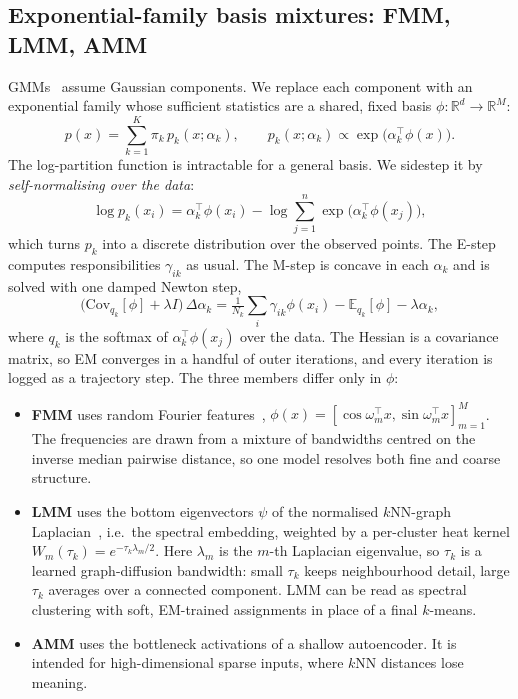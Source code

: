 \documentclass[11pt,a4paper]{article}
\newcommand{\R}{\mathbb{R}}
\begin{document}
\subsection{Exponential-family basis mixtures: FMM, LMM, AMM}\label{sec:basis}
GMMs~\cite{dempster1977maximum} assume Gaussian components. We replace each
component with an exponential family whose sufficient statistics are a shared,
fixed basis $\phi:\R^d\to\R^M$:
\[
  p(x) = \sum_{k=1}^{K}\pi_k\,p_k(x;\alpha_k),\qquad
  p_k(x;\alpha_k) \propto \exp\!\big(\alpha_k^\top\phi(x)\big).
\]
The log-partition function is intractable for a general basis. We sidestep it
by \emph{self-normalising over the data}:
\[
  \log p_k(x_i) = \alpha_k^\top\phi(x_i) - \log\sum_{j=1}^{n}\exp\!\big(\alpha_k^\top\phi(x_j)\big),
\]
which turns $p_k$ into a discrete distribution over the observed points. The
E-step computes responsibilities $\gamma_{ik}$ as usual. The M-step is
concave in each $\alpha_k$ and is solved with one damped Newton step,
\[
  \big(\mathrm{Cov}_{q_k}[\phi] + \lambda I\big)\,\Delta\alpha_k
  = \tfrac{1}{N_k}\textstyle\sum_i\gamma_{ik}\phi(x_i) - \mathbb{E}_{q_k}[\phi] - \lambda\alpha_k,
\]
where $q_k$ is the softmax of $\alpha_k^\top\phi(x_j)$ over the data. The
Hessian is a covariance matrix, so EM converges in a handful of outer
iterations, and every iteration is logged as a trajectory step. The three
members differ only in $\phi$:
\begin{itemize}
  \item \textbf{FMM} uses random Fourier features~\cite{rahimi2007random},
  $\phi(x) = [\cos\omega_m^\top x, \sin\omega_m^\top x]_{m=1}^{M}$. The
  frequencies are drawn from a mixture of bandwidths centred on the inverse
  median pairwise distance, so one model resolves both fine and coarse
  structure.
  \item \textbf{LMM} uses the bottom eigenvectors $\psi$ of the normalised
  $k$NN-graph Laplacian~\cite{vonluxburg2007tutorial}, i.e.\ the spectral
  embedding, weighted by a per-cluster heat kernel
  $W_m(\tau_k) = e^{-\tau_k\lambda_m/2}$. Here $\lambda_m$ is the $m$-th
  Laplacian eigenvalue, so $\tau_k$ is a learned graph-diffusion bandwidth:
  small $\tau_k$ keeps neighbourhood detail, large $\tau_k$ averages over a
  connected component. LMM can be read as spectral clustering with soft,
  EM-trained assignments in place of a final $k$-means.
  \item \textbf{AMM} uses the bottleneck activations of a shallow autoencoder.
  It is intended for high-dimensional sparse inputs, where $k$NN distances
  lose meaning.
\end{itemize}
\end{document}
